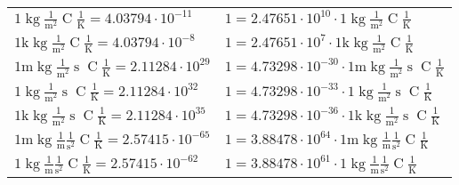 \begin{center}
\begin{longtable}{l l}
{\color{black}$1 \bm{\mathrm{ }}\operatorname{kg}\frac1{\operatorname{m}^2}{}{\operatorname{C}}\frac1{\operatorname{K}} = 4.03794\cdot10^{-11} $}   & {\color{black}$ 1 = 2.47651\cdot10^{10} \cdot 1 \bm{\mathrm{ }}\operatorname{kg}\frac1{\operatorname{m}^2}{}{\operatorname{C}}\frac1{\operatorname{K}}$}  \\
{\color{gray}$1 \bm{\mathrm{ k}}\operatorname{kg}\frac1{\operatorname{m}^2}{}{\operatorname{C}}\frac1{\operatorname{K}} = 4.03794\cdot10^{-8} $}   & {\color{gray}$ 1 = 2.47651\cdot10^{7} \cdot 1 \bm{\mathrm{ k}}\operatorname{kg}\frac1{\operatorname{m}^2}{}{\operatorname{C}}\frac1{\operatorname{K}}$}  \\
{\color{gray}$1 \bm{\mathrm{ m}}\operatorname{kg}\frac1{\operatorname{m}^2}{\operatorname{s}}{\operatorname{C}}\frac1{\operatorname{K}} = 2.11284\cdot10^{29} $}   & {\color{gray}$ 1 = 4.73298\cdot10^{-30} \cdot 1 \bm{\mathrm{ m}}\operatorname{kg}\frac1{\operatorname{m}^2}{\operatorname{s}}{\operatorname{C}}\frac1{\operatorname{K}}$}  \\
{\color{black}$1 \bm{\mathrm{ }}\operatorname{kg}\frac1{\operatorname{m}^2}{\operatorname{s}}{\operatorname{C}}\frac1{\operatorname{K}} = 2.11284\cdot10^{32} $}   & {\color{black}$ 1 = 4.73298\cdot10^{-33} \cdot 1 \bm{\mathrm{ }}\operatorname{kg}\frac1{\operatorname{m}^2}{\operatorname{s}}{\operatorname{C}}\frac1{\operatorname{K}}$}  \\
{\color{gray}$1 \bm{\mathrm{ k}}\operatorname{kg}\frac1{\operatorname{m}^2}{\operatorname{s}}{\operatorname{C}}\frac1{\operatorname{K}} = 2.11284\cdot10^{35} $}   & {\color{gray}$ 1 = 4.73298\cdot10^{-36} \cdot 1 \bm{\mathrm{ k}}\operatorname{kg}\frac1{\operatorname{m}^2}{\operatorname{s}}{\operatorname{C}}\frac1{\operatorname{K}}$}  \\
{\color{gray}$1 \bm{\mathrm{ m}}\operatorname{kg}\frac1{\operatorname{m}}\frac1{\operatorname{s}^2}{\operatorname{C}}\frac1{\operatorname{K}} = 2.57415\cdot10^{-65} $}   & {\color{gray}$ 1 = 3.88478\cdot10^{64} \cdot 1 \bm{\mathrm{ m}}\operatorname{kg}\frac1{\operatorname{m}}\frac1{\operatorname{s}^2}{\operatorname{C}}\frac1{\operatorname{K}}$}  \\
{\color{black}$1 \bm{\mathrm{ }}\operatorname{kg}\frac1{\operatorname{m}}\frac1{\operatorname{s}^2}{\operatorname{C}}\frac1{\operatorname{K}} = 2.57415\cdot10^{-62} $}   & {\color{black}$ 1 = 3.88478\cdot10^{61} \cdot 1 \bm{\mathrm{ }}\operatorname{kg}\frac1{\operatorname{m}}\frac1{\operatorname{s}^2}{\operatorname{C}}\frac1{\operatorname{K}}$}  \\

\end{longtable}
\end{center}
